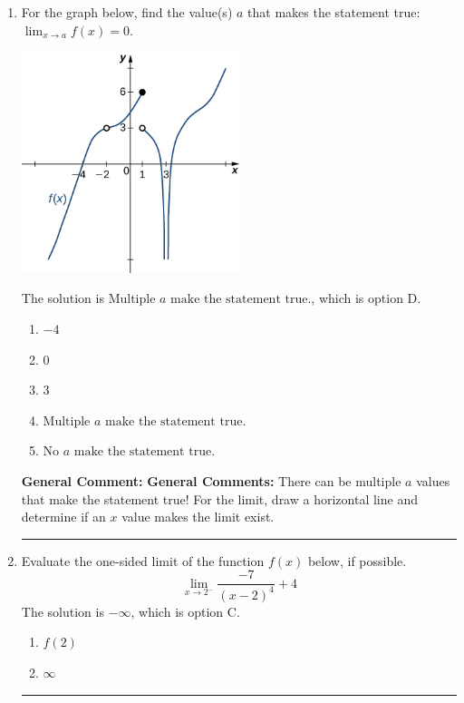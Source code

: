 \documentclass{extbook}[14pt]
\newcommand{\litem}[1]{\item #1

\rule{\textwidth}{0.4pt}}
\begin{document}
\begin{enumerate}\litem{
For the graph below, find the value(s) $a$ that makes the statement true: $ \displaystyle \lim_{x \rightarrow a} f(x) = 0$.

\begin{center}
    \includegraphics[width=0.5\textwidth]{../Figures/evaluateLimitGraphicallyCopyC.png}
\end{center}


The solution is \( \text{Multiple } a \text{ make the statement true}. \), which is option D.\begin{enumerate}[label=\Alph*.]
\item \( -4 \)


\item \( 0 \)


\item \( 3 \)


\item \( \text{Multiple } a \text{ make the statement true}. \)


\item \( \text{No } a \text{ make the statement true}. \)


\end{enumerate}

\textbf{General Comment:} \textbf{General Comments:} There can be multiple $a$ values that make the statement true! For the limit, draw a horizontal line and determine if an $x$ value makes the limit exist.
}
\litem{
Evaluate the one-sided limit of the function $f(x)$ below, if possible.
\[ \lim_{x \rightarrow 2^-} \frac{-7}{(x-2)^4}+4 \]The solution is \( -\infty \), which is option C.\begin{enumerate}[label=\Alph*.]
\item \( f(2) \)


\item \( \infty \)



\end{enumerate}}
\end{enumerate}
\end{document}
